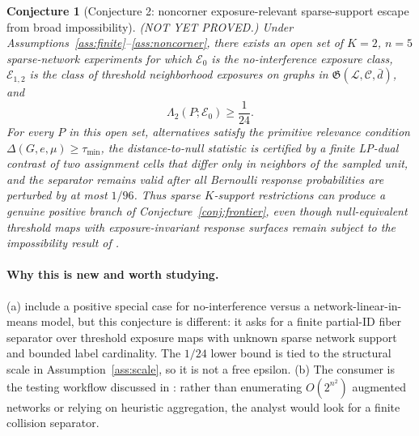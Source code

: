 \documentclass[11pt]{article}
\theoremstyle{definition}
\theoremstyle{plain}
\newtheorem{conjecture}{Conjecture}
\theoremstyle{remark}
\begin{document}
\begin{conjecture}[Conjecture 2: noncorner exposure-relevant sparse-support escape from broad impossibility]\label{conj:noncorner}
(NOT YET PROVED.)  Under Assumptions~\ref{ass:finite}--\ref{ass:noncorner}, there exists an open set of \(K=2\), \(n=5\) sparse-network experiments for which \(\mathcal E_0\) is the no-interference exposure class, \(\mathcal E_{1,2}\) is the class of threshold neighborhood exposures on graphs in \(\mathfrak G(\mathcal L,\mathcal C,\bar d)\), and
\[
\Lambda_2(P;\mathcal E_0)\ge \frac{1}{24}.
\]
For every \(P\) in this open set, alternatives satisfy the primitive relevance condition \(\Delta(G,e,\mu)\ge\tau_{\min}\), the distance-to-null statistic is certified by a finite LP-dual contrast of two assignment cells that differ only in neighbors of the sampled unit, and the separator remains valid after all Bernoulli response probabilities are perturbed by at most \(1/96\).  Thus sparse \(K\)-support restrictions can produce a genuine positive branch of Conjecture~\ref{conj:frontier}, even though null-equivalent threshold maps with exposure-invariant response surfaces remain subject to the impossibility result of \citet{GaoHarshawSavjeWang2026}.
\end{conjecture}
\paragraph{Why this is new and worth studying.}
(a) \citet[Section~4, Proposition~4.1 and Theorem~4.2]{GaoHarshawSavjeWang2026} include a positive special case for no-interference versus a network-linear-in-means model, but this conjecture is different: it asks for a finite partial-ID fiber separator over threshold exposure maps with unknown sparse network support and bounded label cardinality.  The \(1/24\) lower bound is tied to the structural scale in Assumption~\ref{ass:scale}, so it is not a free epsilon.  (b) The consumer is the testing workflow discussed in \citet[Discussion, Section~8]{WeinsteinNevo2026}: rather than enumerating \(O(2^{n^2})\) augmented networks or relying on heuristic aggregation, the analyst would look for a finite collision separator.
\end{document}
